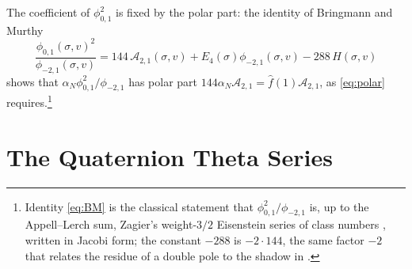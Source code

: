 \documentclass[11pt]{amsart}
\numberwithin{equation}{section}
\theoremstyle{plain}
\theoremstyle{remark}
\newcommand{\cA}{\mathcal{A}}
\newcommand{\pmi}{\phi_{-2,1}}
\newcommand{\pz}{\phi_{0,1}}
\begin{document}
The coefficient of $\pz^2$ is fixed by the polar part: the identity of Bringmann and Murthy \cite[Section~3]{BM13}
\begin{equation}\label{eq:BM}
\frac{\pz(\sigma,v)^2}{\pmi(\sigma,v)}=144\,\cA_{2,1}(\sigma,v)+E_4(\sigma)\pmi(\sigma,v)-288\,H(\sigma,v)
\end{equation}
shows that $\alpha_N\pz^2/\pmi$ has polar part $144\alpha_N\cA_{2,1}=\hat f(1)\cA_{2,1}$, as \eqref{eq:polar} requires.\footnote{Identity \eqref{eq:BM} is the classical statement that $\pz^2/\pmi$ is, up to the Appell--Lerch sum, Zagier's weight-$3/2$ Eisenstein series of class numbers \cite{Zag75}, written in Jacobi form; the constant $-288$ is $-2\cdot144$, the same factor $-2$ that relates the residue of a double pole to the shadow in \cite{DMZ12}.}

\section{The Quaternion Theta Series}\label{sec:theta}
\end{document}
